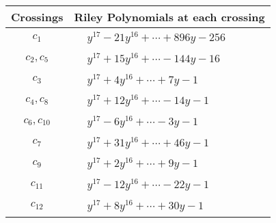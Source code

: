 \documentclass[1p]{elsarticle_modified}
\theoremstyle{definition}
\begin{document}
\begin{tabular}{m{50pt}|m{274pt}}
Crossings & \hspace{64pt}Riley Polynomials at each crossing \\
\hline $$\begin{aligned}c_{1}\end{aligned}$$&$\begin{aligned}
&y^{17}-21 y^{16}+\cdots+896 y-256
\end{aligned}$\\
\hline $$\begin{aligned}c_{2},c_{5}\end{aligned}$$&$\begin{aligned}
&y^{17}+15 y^{16}+\cdots-144 y-16
\end{aligned}$\\
\hline $$\begin{aligned}c_{3}\end{aligned}$$&$\begin{aligned}
&y^{17}+4 y^{16}+\cdots+7 y-1
\end{aligned}$\\
\hline $$\begin{aligned}c_{4},c_{8}\end{aligned}$$&$\begin{aligned}
&y^{17}+12 y^{16}+\cdots-14 y-1
\end{aligned}$\\
\hline $$\begin{aligned}c_{6},c_{10}\end{aligned}$$&$\begin{aligned}
&y^{17}-6 y^{16}+\cdots-3 y-1
\end{aligned}$\\
\hline $$\begin{aligned}c_{7}\end{aligned}$$&$\begin{aligned}
&y^{17}+31 y^{16}+\cdots+46 y-1
\end{aligned}$\\
\hline $$\begin{aligned}c_{9}\end{aligned}$$&$\begin{aligned}
&y^{17}+2 y^{16}+\cdots+9 y-1
\end{aligned}$\\
\hline $$\begin{aligned}c_{11}\end{aligned}$$&$\begin{aligned}
&y^{17}-12 y^{16}+\cdots-22 y-1
\end{aligned}$\\
\hline $$\begin{aligned}c_{12}\end{aligned}$$&$\begin{aligned}
&y^{17}+8 y^{16}+\cdots+30 y-1
\end{aligned}$\\
\hline
\end{tabular}\\~\\
\end{document}
